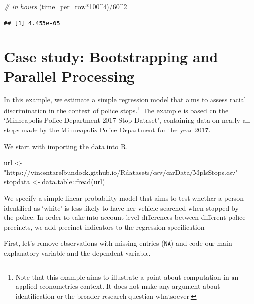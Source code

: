\documentclass[
  12pt,
]{style/krantz}
\newenvironment{Shaded}{\begin{snugshade}}{\end{snugshade}}
\newcommand{\CommentTok}[1]{\textcolor[rgb]{0.56,0.35,0.01}{\textit{#1}}}
\newcommand{\DecValTok}[1]{\textcolor[rgb]{0.00,0.00,0.81}{#1}}
\newcommand{\FunctionTok}[1]{\textcolor[rgb]{0.00,0.00,0.00}{#1}}
\newcommand{\NormalTok}[1]{#1}
\newcommand{\OtherTok}[1]{\textcolor[rgb]{0.56,0.35,0.01}{#1}}
\newcommand{\SpecialCharTok}[1]{\textcolor[rgb]{0.00,0.00,0.00}{#1}}
\newcommand{\StringTok}[1]{\textcolor[rgb]{0.31,0.60,0.02}{#1}}
\begin{document}
\begin{Shaded}
\begin{Highlighting}[]
\CommentTok{\# in hours}
\NormalTok{(time\_per\_row}\SpecialCharTok{*}\DecValTok{100}\SpecialCharTok{\^{}}\DecValTok{4}\NormalTok{)}\SpecialCharTok{/}\DecValTok{60}\SpecialCharTok{\^{}}\DecValTok{2} 
\end{Highlighting}
\end{Shaded}

\begin{verbatim}
## [1] 4.453e-05
\end{verbatim}

\hypertarget{case-study-bootstrapping-and-parallel-processing}{%
\section{Case study: Bootstrapping and Parallel Processing}\label{case-study-bootstrapping-and-parallel-processing}}

In this example, we estimate a simple regression model that aims to assess racial discrimination in the context of police stops.\footnote{Note that this example aims to illustrate a point about computation in an applied econometrics context. It does not make any argument about identification or the broader research question whatsoever.} The example is based on the `Minneapolis Police Department 2017 Stop Dataset', containing data on nearly all stops made by the Minneapolis Police Department for the year 2017.

We start with importing the data into R.

\begin{Shaded}
\begin{Highlighting}[]
\NormalTok{url }\OtherTok{\textless{}{-}} \StringTok{"https://vincentarelbundock.github.io/Rdatasets/csv/carData/MplsStops.csv"}
\NormalTok{stopdata }\OtherTok{\textless{}{-}}\NormalTok{ data.table}\SpecialCharTok{::}\FunctionTok{fread}\NormalTok{(url) }
\end{Highlighting}
\end{Shaded}

We specify a simple linear probability model that aims to test whether a person identified as `white' is less likely to have her vehicle searched when stopped by the police. In order to take into account level-differences between different police precincts, we add precinct-indicators to the regression specification

First, let's remove observations with missing entries (\texttt{NA}) and code our main explanatory variable and the dependent variable.
\end{document}
